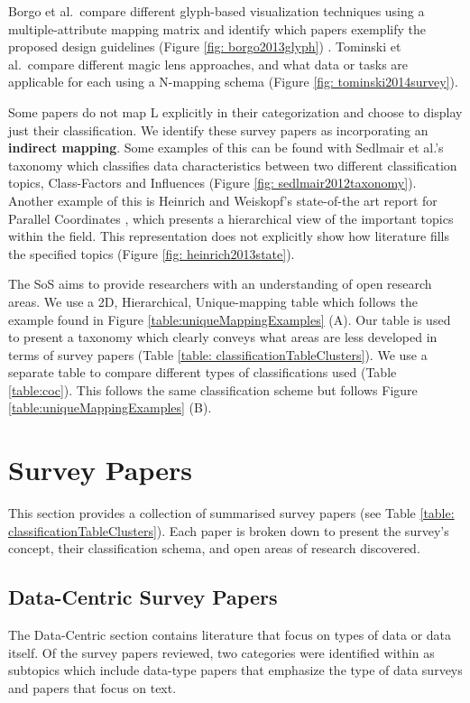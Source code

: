 Borgo et al.\ compare different glyph-based visualization techniques using a multiple-attribute mapping matrix and identify which papers exemplify the proposed design guidelines (Figure \ref{fig: borgo2013glyph}) \cite{borgo2013glyph}. Tominski et al.\ compare different magic lens approaches, and what data or tasks are applicable for each \cite{tominski2014survey} using a N-mapping schema (Figure \ref{fig: tominski2014survey}).


Some papers do not map {\color{blue} L} explicitly in their categorization and choose to display just their classification. We identify these survey papers as incorporating an \textbf{indirect mapping}. Some examples of this can be found with Sedlmair et al.'s  taxonomy \cite{sedlmair2012taxonomy} which classifies data characteristics between two different classification topics, Class-Factors and Influences (Figure \ref{fig: sedlmair2012taxonomy}). Another example of this is Heinrich and Weiskopf's state-of-the art  report for Parallel Coordinates \cite{heinrich2013state}, which presents a hierarchical view of the important topics within the field. This representation does not explicitly show how literature fills the specified topics (Figure \ref{fig: heinrich2013state}). 

The SoS aims to provide researchers with an understanding of open research areas. We use a 2D, Hierarchical, Unique-mapping table which follows the  example found in Figure \ref{table:uniqueMappingExamples} (A). Our table is used to present a taxonomy which clearly conveys what areas are less developed in terms of survey papers (Table \ref{table: classificationTableClusters}). We use a separate table to compare different types of classifications used (Table \ref{table:coc}). This follows the same classification scheme but follows Figure \ref{table:uniqueMappingExamples} (B). 

\section{Survey Papers}
This section provides a collection of summarised survey papers (see Table \ref{table: classificationTableClusters}). Each paper is broken down to present the survey's concept, their classification schema, and open areas of research  discovered.
\subsection{Data-Centric Survey Papers}
The Data-Centric section contains literature that focus on types of data or data itself. Of the survey papers reviewed, two categories were identified within as subtopics which include data-type papers that emphasize the type of data surveys and papers that focus on text.

